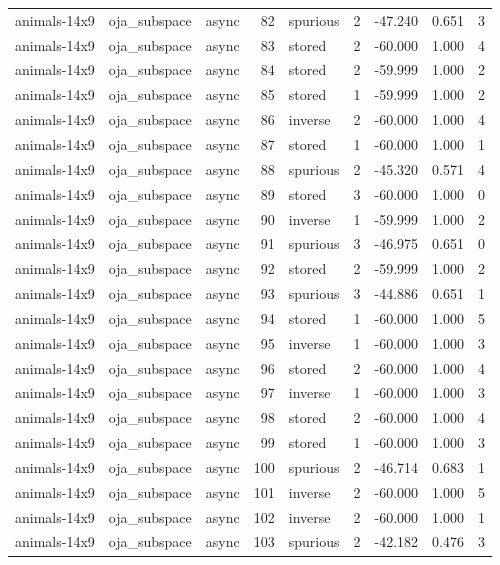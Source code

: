 \begin{tabular}{lllrlrrrr}
animals-14x9 & oja\_subspace & async & 82 & spurious & 2 & -47.240 & 0.651 & 3 \\
animals-14x9 & oja\_subspace & async & 83 & stored & 2 & -60.000 & 1.000 & 4 \\
animals-14x9 & oja\_subspace & async & 84 & stored & 2 & -59.999 & 1.000 & 2 \\
animals-14x9 & oja\_subspace & async & 85 & stored & 1 & -59.999 & 1.000 & 2 \\
animals-14x9 & oja\_subspace & async & 86 & inverse & 2 & -60.000 & 1.000 & 4 \\
animals-14x9 & oja\_subspace & async & 87 & stored & 1 & -60.000 & 1.000 & 1 \\
animals-14x9 & oja\_subspace & async & 88 & spurious & 2 & -45.320 & 0.571 & 4 \\
animals-14x9 & oja\_subspace & async & 89 & stored & 3 & -60.000 & 1.000 & 0 \\
animals-14x9 & oja\_subspace & async & 90 & inverse & 1 & -59.999 & 1.000 & 2 \\
animals-14x9 & oja\_subspace & async & 91 & spurious & 3 & -46.975 & 0.651 & 0 \\
animals-14x9 & oja\_subspace & async & 92 & stored & 2 & -59.999 & 1.000 & 2 \\
animals-14x9 & oja\_subspace & async & 93 & spurious & 3 & -44.886 & 0.651 & 1 \\
animals-14x9 & oja\_subspace & async & 94 & stored & 1 & -60.000 & 1.000 & 5 \\
animals-14x9 & oja\_subspace & async & 95 & inverse & 1 & -60.000 & 1.000 & 3 \\
animals-14x9 & oja\_subspace & async & 96 & stored & 2 & -60.000 & 1.000 & 4 \\
animals-14x9 & oja\_subspace & async & 97 & inverse & 1 & -60.000 & 1.000 & 3 \\
animals-14x9 & oja\_subspace & async & 98 & stored & 2 & -60.000 & 1.000 & 4 \\
animals-14x9 & oja\_subspace & async & 99 & stored & 1 & -60.000 & 1.000 & 3 \\
animals-14x9 & oja\_subspace & async & 100 & spurious & 2 & -46.714 & 0.683 & 1 \\
animals-14x9 & oja\_subspace & async & 101 & inverse & 2 & -60.000 & 1.000 & 5 \\
animals-14x9 & oja\_subspace & async & 102 & inverse & 2 & -60.000 & 1.000 & 1 \\
animals-14x9 & oja\_subspace & async & 103 & spurious & 2 & -42.182 & 0.476 & 3 \\

\end{tabular}

